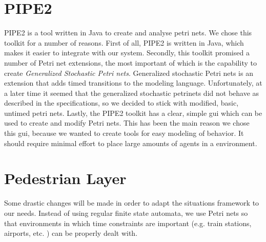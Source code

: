\documentclass[11pt]{book}
\begin{document}
\section{PIPE2}
PIPE2 is a tool written in Java to create and analyse petri nets. We chose this toolkit for a number of reasons. First of all, PIPE2 is written in Java, which makes it easier to integrate with our system. Secondly, this toolkit promised a number of Petri net extensions, the most important of which is the capability to create \emph{Generalized Stochastic Petri nets}. Generalized stochastic Petri nets is an extension that adds timed transitions to the modeling language.
Unfortunately, at a later time it seemed that the generalized stochastic petrinets did not behave as described in the specifications, so we decided to stick with modified, basic, untimed petri nets. Lastly, the PIPE2 toolkit has a clear, simple gui which can be used to create and modify Petri nets. This has been the main reason we chose this gui, because we wanted to create tools for easy modeling of behavior. It should require minimal effort to place large amounts of agents in a environment.




\section{Pedestrian Layer}
Some drastic changes will be made in order to adapt the situations framework to our needs. Instead of using regular finite state automata, we use Petri nets so that environments in which time constraints are important (e.g. train stations, airports, etc. ) can be properly dealt with.
\end{document}
